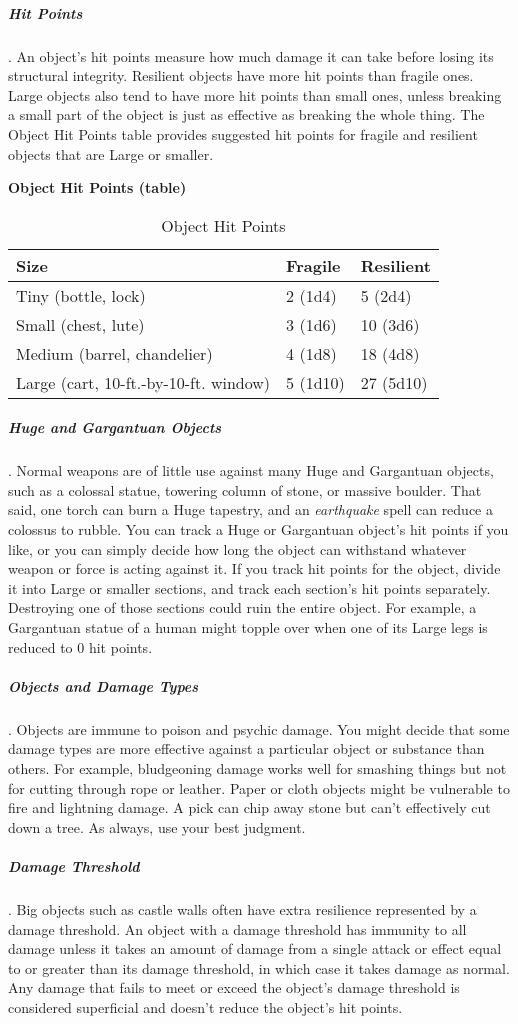 \subparagraph*{Hit Points}. An object's hit points measure how much damage it can take before losing its structural integrity. Resilient objects have more hit points than fragile ones. Large objects also tend to have more hit points than small ones, unless breaking a small part of the object is just as effective as breaking the whole thing. The Object Hit Points table provides suggested hit points for fragile and resilient objects that are Large or smaller.

\textbf{Object Hit Points (table)}
\begin{table}
    \centering
    \begin{tabular}{|l|l|l|}
        Size & Fragile & Resilient \\\hline
        Tiny (bottle, lock) & 2 (1d4) & 5 (2d4) \\\hline
        Small (chest, lute) & 3 (1d6) & 10 (3d6) \\\hline
        Medium (barrel, chandelier) & 4 (1d8) & 18 (4d8) \\\hline
        Large (cart, 10-ft.-by-10-ft. window) & 5 (1d10) & 27 (5d10) \\\hline
    \end{tabular}
    \caption[Object HP]{Object Hit Points}
    \label{tbl:object-hp}
\end{table}

\subparagraph*{Huge and Gargantuan Objects}. Normal weapons are of little use against many Huge and Gargantuan objects, such as a colossal statue, towering column of stone, or massive boulder. That said, one torch can burn a Huge tapestry, and an \textit{earthquake} spell can reduce a colossus to rubble. You can track a Huge or Gargantuan object's hit points if you like, or you can simply decide how long the object can withstand whatever weapon or force is acting against it. If you track hit points for the object, divide it into Large or smaller sections, and track each section's hit points separately. Destroying one of those sections could ruin the entire object. For example, a Gargantuan statue of a human might topple over when one of its Large legs is reduced to 0 hit points.

\subparagraph*{Objects and Damage Types}. Objects are immune to poison and psychic damage. You might decide that some damage types are more effective against a particular object or substance than others. For example, bludgeoning damage works well for smashing things but not for cutting through rope or leather. Paper or cloth objects might be vulnerable to fire and lightning damage. A pick can chip away stone but can't effectively cut down a tree. As always, use your best judgment.

\subparagraph*{Damage Threshold}. Big objects such as castle walls often have extra resilience represented by a damage threshold. An object with a damage threshold has immunity to all damage unless it takes an amount of damage from a single attack or effect equal to or greater than its damage threshold, in which case it takes damage as normal. Any damage that fails to meet or exceed the object's damage threshold is considered superficial and doesn't reduce the object's hit points.

